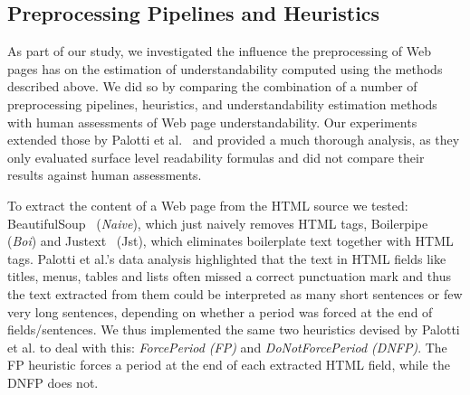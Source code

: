 \subsection{Preprocessing Pipelines and Heuristics}
\label{sec:pipelines}

As part of our study, we investigated the influence the preprocessing of Web pages has on the estimation of understandability computed using the methods described above.
We did so by comparing the combination of a number of preprocessing pipelines, heuristics, and understandability estimation methods with human assessments of Web page understandability. 
Our experiments extended those by Palotti et al.~\cite{palotti15} and provided a much thorough analysis, as they only evaluated surface level readability formulas and did not compare their results against human assessments. 

To extract the content of a Web page from the HTML source we tested: BeautifulSoup~\cite{bs4} (\textit{Naive}), which just naively removes HTML tags, Boilerpipe~\cite{kohlschutter10} (\textit{Boi}) and Justext~\cite{jan11} ({Jst}), which eliminates boilerplate text together with HTML tags. 
Palotti et al.'s data analysis highlighted that the text in HTML fields like titles, menus, tables and lists often missed a correct punctuation mark and thus the text extracted from them could be interpreted as many short sentences or few very long sentences, depending on whether a period was forced at the end of fields/sentences. We thus implemented the same two heuristics devised by Palotti et al. to deal with this: \textit{ForcePeriod (FP)} and \textit{DoNotForcePeriod (DNFP)}. The FP heuristic forces a period at the end of each extracted HTML field, while the DNFP does not. 


